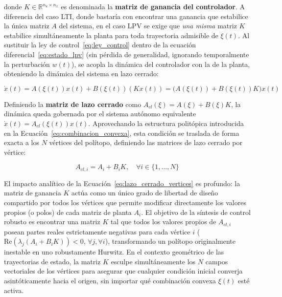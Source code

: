 donde $K \in \mathbb{R}^{n_u \times n_x}$ es denominada la \textbf{matriz de ganancia del controlador}. A diferencia del caso LTI, donde bastaría con encontrar una ganancia que estabilice la única matriz $A$ del sistema, en el caso LPV se exige que \emph{una misma} matriz $K$ estabilice simultáneamente la planta para toda trayectoria admisible de $\xi(t)$. Al sustituir la ley de control~\eqref{eq:ley_control} dentro de la ecuación diferencial~\eqref{eq:estado_lpv} (sin pérdida de generalidad, ignorando temporalmente la perturbación $w(t)$), se acopla la dinámica del controlador con la de la planta, obteniendo la dinámica del sistema en lazo cerrado:

\begin{equation}
    \dot{x}(t) = A(\xi(t))x(t) + B(\xi(t))(Kx(t)) = \big(A(\xi(t)) + B(\xi(t))K\big)x(t)
    \label{eq:dinamica_lazo_cerrado}
\end{equation}

Definiendo la \textbf{matriz de lazo cerrado} como $A_{cl}(\xi) = A(\xi) + B(\xi)K$, la dinámica queda gobernada por el sistema autónomo equivalente $\dot{x}(t) = A_{cl}(\xi(t))x(t)$. Aprovechando la estructura politópica introducida en la Ecuación~\eqref{eq:combinacion_convexa}, esta condición se traslada de forma exacta a los $N$ vértices del polítopo, definiendo las matrices de lazo cerrado por vértice:

\begin{equation}
    A_{cl,i} = A_i + B_i K, \quad \forall i \in \{1, \dots, N\}
    \label{eq:lazo_cerrado_vertices}
\end{equation}

El impacto analítico de la Ecuación~\eqref{eq:lazo_cerrado_vertices} es profundo: la matriz de ganancia $K$ actúa como un único grado de libertad de diseño compartido por todos los vértices que permite modificar directamente los valores propios (o polos) de cada matriz de planta $A_i$. El objetivo de la síntesis de control robusto es encontrar una matriz $K$ tal que todos los valores propios de $A_{cl,i}$ posean partes reales estrictamente negativas para cada vértice $i$ ($\text{Re}(\lambda_j(A_i+B_iK)) < 0$, $\forall j, \forall i$), transformando un polítopo originalmente inestable en uno robustamente Hurwitz. En el contexto geométrico de las trayectorias de estado, la matriz $K$ esculpe simultáneamente los $N$ campos vectoriales de los vértices para asegurar que cualquier condición inicial converja asintóticamente hacia el origen, sin importar qué combinación convexa $\xi(t)$ esté activa.

